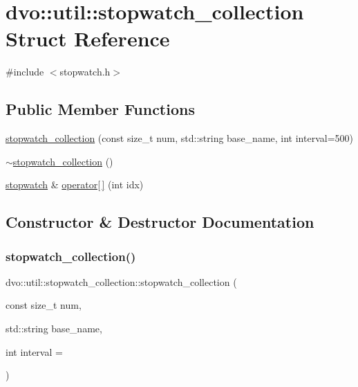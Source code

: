 \hypertarget{structdvo_1_1util_1_1stopwatch__collection}{}\section{dvo\+:\+:util\+:\+:stopwatch\+\_\+collection Struct Reference}
\label{structdvo_1_1util_1_1stopwatch__collection}


{\ttfamily \#include $<$stopwatch.\+h$>$}

\subsection*{Public Member Functions}
\begin{DoxyCompactItemize}
\item 
\mbox{\hyperlink{structdvo_1_1util_1_1stopwatch__collection_a83fed33582affd6ecd3b656e8269adb9}{stopwatch\+\_\+collection}} (const size\+\_\+t num, std\+::string base\+\_\+name, int interval=500)
\item 
\mbox{\hyperlink{structdvo_1_1util_1_1stopwatch__collection_afbdd3c89b3f56c4343c2169c7d045a5c}{$\sim$stopwatch\+\_\+collection}} ()
\item 
\mbox{\hyperlink{structdvo_1_1util_1_1stopwatch}{stopwatch}} \& \mbox{\hyperlink{structdvo_1_1util_1_1stopwatch__collection_afac648451b26aeb38a3903f651323701}{operator\mbox{[}$\,$\mbox{]}}} (int idx)
\end{DoxyCompactItemize}


\subsection{Constructor \& Destructor Documentation}
\mbox{\label{structdvo_1_1util_1_1stopwatch__collection_a83fed33582affd6ecd3b656e8269adb9}} 
\subsubsection{\texorpdfstring{stopwatch\+\_\+collection()}{stopwatch\_collection()}}
{\footnotesize\ttfamily dvo\+::util\+::stopwatch\+\_\+collection\+::stopwatch\+\_\+collection (\begin{DoxyParamCaption}\item[{const size\+\_\+t}]{num,  }\item[{std\+::string}]{base\+\_\+name,  }\item[{int}]{interval = {} }\end{DoxyParamCaption})\hspace{0.3cm}{\ttfamily [inline]}}

